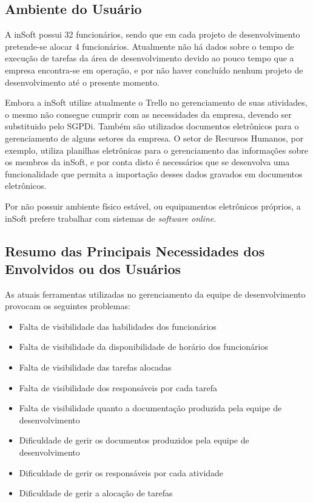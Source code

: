     \subsection{Ambiente do Usuário}

      A inSoft possui 32 funcionários, sendo que em cada projeto de desenvolvimento pretende-se alocar 4 funcionários. Atualmente não há dados sobre o tempo de execução de tarefas da área de desenvolvimento devido ao pouco tempo que a empresa encontra-se em operação, e por não haver concluído nenhum projeto de desenvolvimento até o presente momento.

      Embora a inSoft utilize atualmente o Trello no gerenciamento de suas atividades, o mesmo não consegue cumprir com as necessidades da empresa, devendo ser substituido pelo SGPDi. Também são utilizados documentos eletrônicos para o gerenciamento de alguns setores da empresa. O setor de Recursos Humanos, por exemplo, utiliza planilhas eletrônicas para o gerenciamento das informações sobre os membros da inSoft, e por conta disto é necessários que se desenvolva uma funcionalidade que permita a importação desses dados gravados em documentos eletrônicos.

      Por não possuir ambiente físico estável, ou equipamentos eletrônicos próprios, a inSoft prefere trabalhar com sistemas de \emph{software} \emph{online}.

    \subsection{Resumo das Principais Necessidades dos Envolvidos ou dos Usuários}

      As atuais  ferramentas utilizadas no gerenciamento da equipe de desenvolvimento provocam os seguintes problemas:

      \begin{itemize}
        \item Falta de visibilidade das habilidades dos funcionários
        \item Falta de visibilidade da disponibilidade de horário dos funcionários
        \item Falta de visibilidade das tarefas alocadas
        \item Falta de visibilidade dos responsáveis por cada tarefa
        \item Falta de visibilidade quanto a documentação produzida pela equipe de desenvolvimento
        \item Dificuldade de gerir os documentos produzidos pela equipe de desenvolvimento
        \item Dificuldade de gerir os responsáveis por cada atividade
        \item Dificuldade de gerir a alocação de tarefas
      \end{itemize}

